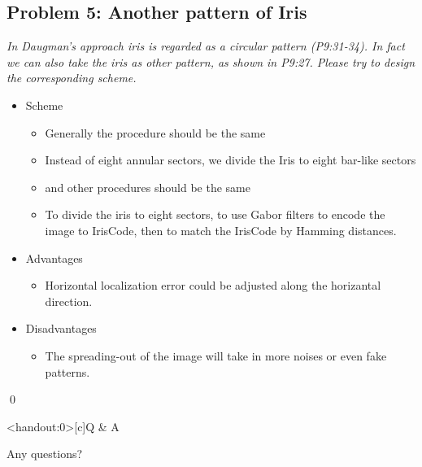 \documentclass[
        ]{beamer}
\begin{document}
    \subsection{Problem 5: Another pattern of Iris}
    
    		\begin{frame}[t]{\subsecname}
    			\begin{overprint}
    			\emph{In Daugman's approach iris is regarded as a circular pattern (P9:31-34). In fact we can also take the iris as other pattern, as shown in P9:27. Please try to design the corresponding scheme.}
    			\onslide<2>  
    			\onslide<3>  
    			\onslide<4>  
    			\onslide<5>  
    			\onslide<6>  
    			\onslide<7>
    				\begin{itemize}
    				\item Scheme		
    					\begin{itemize}
    					\item Generally the procedure should be the same
    					\item Instead of eight annular sectors, we divide the Iris to eight bar-like sectors
    					\item and other procedures should be the same
    					\item To divide the iris to eight sectors, to use Gabor filters to encode the image to IrisCode, then to match the IrisCode by Hamming distances.
    					\end{itemize}		
    				\item Advantages		
    					\begin{itemize}
    					\item Horizontal localization error could be adjusted along the horizantal direction.
    					\end{itemize}	
    				\item Disadvantages		
    					\begin{itemize}
    					\item The spreading-out of the image will take in more noises or even fake patterns.
    					\end{itemize}	
    				\end{itemize}\qed	
    			\end{overprint}
    		\end{frame}  



    \begin{frame}<handout:0>[c]{Q \& A}
        \centerline{\Large{Any questions?}}
    \end{frame}
    
    
    
\end{document}
